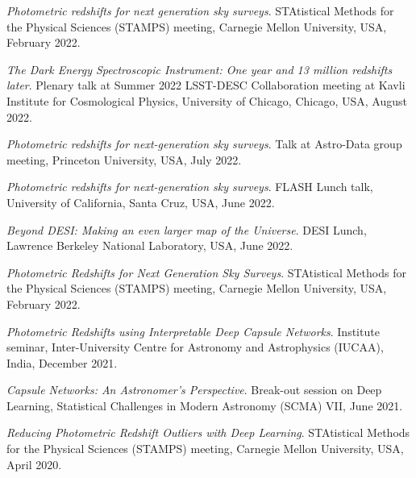\begin{etaremune}[leftmargin=40pt,labelsep=10pt]
    \item \textit{Photometric redshifts for next generation sky surveys}. STAtistical Methods for the Physical Sciences (STAMPS) meeting, Carnegie Mellon University, USA, February 2022.
 
    \item \textit{The Dark Energy Spectroscopic Instrument: One year and 13 million redshifts later}. Plenary talk at Summer 2022 LSST-DESC Collaboration meeting at Kavli Institute for Cosmological Physics, University of Chicago, Chicago, USA, August 2022.
    \item \textit{Photometric redshifts for next-generation sky surveys}. Talk at Astro-Data group meeting, Princeton University, USA, July 2022.
    \item \textit{Photometric redshifts for next-generation sky surveys}. FLASH Lunch talk, University of California, Santa Cruz, USA, June 2022.
    \item \textit{Beyond DESI: Making an even larger map of the Universe}. DESI Lunch, Lawrence Berkeley National Laboratory, USA, June 2022.
    \item \textit{Photometric Redshifts for Next Generation Sky Surveys}. STAtistical Methods for the Physical Sciences (STAMPS) meeting, Carnegie Mellon University, USA, February 2022.
    \item \textit{Photometric Redshifts using Interpretable Deep Capsule Networks}. Institute seminar, Inter-University Centre for Astronomy and Astrophysics (IUCAA), India,  December 2021.
     \item \textit{Capsule Networks: An Astronomer's Perspective}. Break-out session on Deep Learning, Statistical Challenges in Modern Astronomy (SCMA) VII,  June 2021.
    \item \textit{Reducing Photometric Redshift Outliers with Deep Learning}. STAtistical Methods for the Physical Sciences (STAMPS) meeting, Carnegie Mellon University, USA, April 2020.
\end{etaremune}
